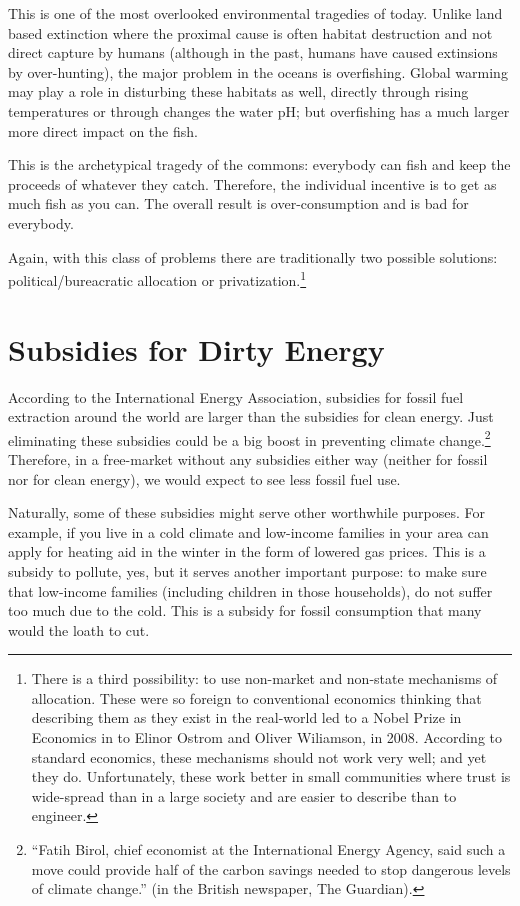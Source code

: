 This is one of the most overlooked environmental tragedies of today. Unlike
land based extinction where the proximal cause is often habitat destruction and
not direct capture by humans (although in the past, humans have caused
extinsions by over-hunting), the major problem in the oceans is overfishing.
Global warming may play a role in disturbing these habitats as well, directly
through rising temperatures or through changes the water pH; but overfishing
has a much larger more direct impact on the fish.

This is the archetypical tragedy of the commons: everybody can fish and keep
the proceeds of whatever they catch. Therefore, the individual incentive is to
get as much fish as you can. The overall result is over-consumption and is bad
for everybody.

Again, with this class of problems there are traditionally two possible
solutions: political/bureacratic allocation or privatization.\footnote{There
is a third possibility: to use non-market and non-state mechanisms of
allocation. These were so foreign to conventional economics thinking that
describing them as they exist in the real-world led to a Nobel Prize in
Economics in to Elinor Ostrom and Oliver Wiliamson, in 2008. According to
standard economics, these mechanisms should not work very well; and yet they
do. Unfortunately, these work better in small communities where trust is
wide-spread than in a large society and are easier to describe than to
engineer.}

\section{Subsidies for Dirty Energy}

According to the International Energy Association, subsidies for fossil fuel
extraction around the world are larger than the subsidies for clean energy.
Just eliminating these subsidies could be a big boost in preventing climate
change.\footnote{``Fatih Birol, chief
economist at the International Energy Agency, said such a move could
provide half of the carbon savings needed to stop dangerous levels of climate
change.'' (in the British newspaper, The Guardian).%
} Therefore, in a free-market without any subsidies either way (neither for
fossil nor for clean energy), we would expect to see less fossil fuel use.

Naturally, some of these subsidies might serve other worthwhile purposes. For
example, if you live in a cold climate and low-income families in your area can
apply for heating aid in the winter in the form of lowered gas prices. This is
a subsidy to pollute, yes, but it serves another important purpose: to make
sure that low-income families (including children in those households), do not
suffer too much due to the cold. This is a subsidy for fossil consumption that
many would the loath to cut.

